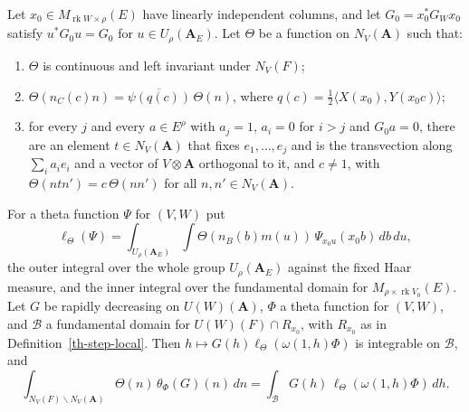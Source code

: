 \begin{lemma}[Unfolding]
Let $x_0\in M_{\operatorname{rk}W\times\rho}(E)$ have linearly independent
columns, and let $G_0=x_0^*G_Wx_0$ satisfy $u^*G_0u=G_0$ for
$u\in U_\rho(\mathbf A_E)$. Let $\Theta$ be a function on $N_V(\mathbf A)$ such
that:
\begin{enumerate}
\item $\Theta$ is continuous and left invariant under $N_V(F)$;
\item $\Theta(n_C(c)n)=\overline{\psi(q(c))}\,\Theta(n)$, where
  $q(c)=\tfrac12\langle X(x_0),Y(x_0c)\rangle$;
\item for every $j$ and every $a\in E^\rho$ with $a_j=1$, $a_i=0$ for $i>j$ and
  $G_0a=0$, there are an element $t\in N_V(\mathbf A)$ that fixes
  $e_1,\ldots,e_j$ and is the transvection along $\sum_ia_ie_i$ and a vector of
  $V\otimes\mathbf A$ orthogonal to it, and $c\neq1$, with
  $\Theta(ntn')=c\,\Theta(nn')$ for all $n,n'\in N_V(\mathbf A)$.
\end{enumerate}
For a theta function $\Psi$ for $(V,W)$ put
\[
\ell_\Theta(\Psi)=\int_{U_\rho(\mathbf A_E)}\int\Theta(n_B(b)m(u))\,\Psi_{x_0u}(x_0b)\,db\,du ,
\]
the outer integral over the whole group $U_\rho(\mathbf A_E)$ against the fixed
Haar measure, and the inner integral over the fundamental domain for
$M_{\rho\times\operatorname{rk}V_0}(E)$. Let $G$ be rapidly decreasing on
$U(W)(\mathbf A)$, $\Phi$ a theta function for $(V,W)$, and $\mathcal B$ a
fundamental domain for $U(W)(F)\cap R_{x_0}$, with $R_{x_0}$ as in
Definition~\ref{th-step-local}. Then $h\mapsto G(h)\ell_\Theta(\omega(1,h)\Phi)$
is integrable on $\mathcal B$, and
\[
\int_{N_V(F)\backslash N_V(\mathbf A)}\Theta(n)\,\theta_\Phi(G)(n)\,dn
=\int_{\mathcal B}G(h)\,\ell_\Theta(\omega(1,h)\Phi)\,dh .
\]
\end{lemma}
